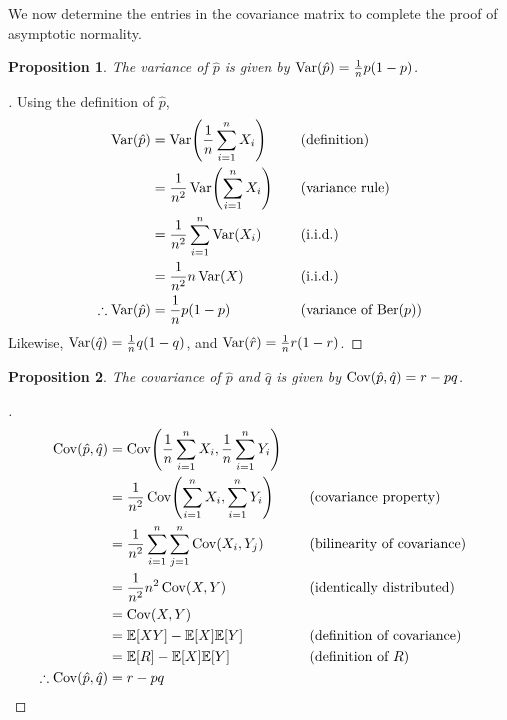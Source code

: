 \documentclass[letterpaper, reqno]{amsart}
\newtheorem{prop}{Proposition}[section]
\renewcommand{\qedsymbol}{\ensuremath{\blacksquare}}
\newenvironment{subproof}[1][\proofname]{%
  \renewcommand{\qedsymbol}{\ensuremath{\square}}%
  \begin{proof}[#1]%
}{%
  \end{proof}%
}
\numberwithin{equation}{section}
\newcommand{\E}[1]{\mathbb{E}\mleft[#1\mright]}
\newcommand{\Var}[1]{\operatorname{Var}\mleft(#1\mright)}
\newcommand{\Cov}[1]{\operatorname{Cov}\mleft(#1\mright)}
\newcommand{\iid}{i.i.d.}
\newcommand{\sumi}[2]{\sum_{#1=1}^{#2}}
\newcommand{\avg}[2]{\frac{1}{#2}\sumi{#1}{#2}}
\newcommand{\by}[1]{&\quad&\text{(#1)}}
\newcommand{\phat}{\hat{p}}
\newcommand{\qhat}{\hat{q}}
\newcommand{\rhat}{\hat{r}}
\DeclareMathOperator{\Ber}{Ber}
\begin{document}
We now determine the entries in the covariance matrix to complete the proof of
asymptotic normality.
\begin{prop}
The variance of $\phat$ is given by $\Var{\phat} = \frac{1}{n} p(1 - p)$.
\end{prop}
\begin{subproof}
  Using the definition of $\phat$,
  \begin{alignat*}{3}
    \Var{\phat} &= \Var{\avg{i}{n} X_i} \by{definition} \\
                &= \frac{1}{n^2}\Var{\sumi{i}{n} X_i} \by{variance rule} \\
                &= \frac{1}{n^2}\sumi{i}{n}\Var{X_i} \by{\iid} \\
                &= \frac{1}{n^2}n\Var{X} \by{\iid} \\
   \therefore \Var{\phat} &= \frac{1}{n} p(1-p) \by{variance of $\Ber(p)$}
  \end{alignat*}
  Likewise, $\Var{\qhat} = \frac{1}{n} q(1 - q)$,
  and $\Var{\rhat} = \frac{1}{n} r(1 - r)$. 
\end{subproof}

\begin{prop}
  The covariance of $\phat$ and $\qhat$ is given by $\Cov{\phat, \qhat} = r - pq$.
\end{prop}
\begin{subproof}
  \begin{alignat*}{3}
    \Cov{\phat, \qhat} &= \Cov{\avg{i}{n} X_i, \avg{i}{n} Y_i} \\
    &= \frac{1}{n^2} \Cov{\sumi{i}{n} X_i, \sumi{i}{n} Y_i} \by{covariance property} \\
    &= \frac{1}{n^2} \sumi{i}{n} \sumi{j}{n} \Cov{X_i, Y_j} \by{bilinearity of covariance} \\
    &= \frac{1}{n^2} n^2 \Cov{X, Y} \by{identically distributed} \\
    &= \Cov{X, Y}  \\
    &= \E{XY} - \E{X}\E{Y} \by{definition of covariance} \\
    &= \E{R} - \E{X}\E{Y} \by{definition of $R$} \\
    \therefore \Cov{\phat, \qhat} &= r - pq \tag*{\qedhere}
  \end{alignat*}
\end{subproof}
\end{document}
